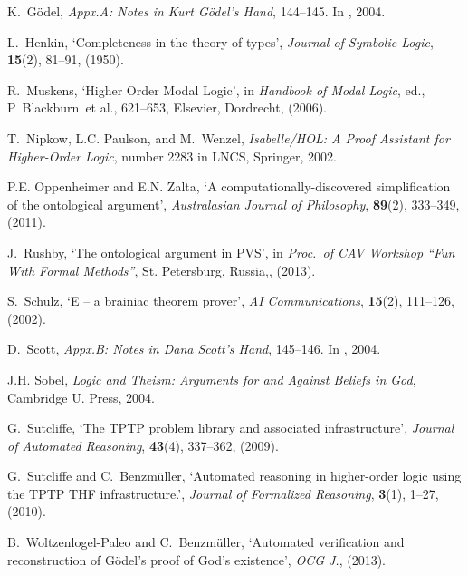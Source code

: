 \documentclass{birkjour}
\theoremstyle{definition}
\theoremstyle{remark}
\numberwithin{equation}{section}
\begin{document}
\begin{thebibliography}{1}
K.~G\"odel, {\em Appx.A: Notes in Kurt G\"odel's Hand},  144--145.
\newblock In  \cite{sobel2004logic}, 2004.

L.~Henkin, `Completeness in the theory of types', {\em Journal of Symbolic
  Logic}, {\bf 15}(2),  81--91, (1950).

R.~Muskens, `{Higher Order Modal Logic}', in {\em Handbook of Modal Logic},
  ed., P~Blackburn~et al.,  621--653, Elsevier, Dordrecht, (2006).

T.~Nipkow, L.C. Paulson, and M.~Wenzel, {\em {Isabelle/HOL: A Proof Assistant
  for Higher-Order Logic}}, number 2283 in LNCS, Springer, 2002.

P.E. Oppenheimer and E.N. Zalta, `A computationally-discovered simplification
  of the ontological argument', {\em Australasian Journal of Philosophy}, {\bf
  89}(2),  333--349, (2011).

J.~Rushby, `The ontological argument in {PVS}', in {\em Proc.~of CAV Workshop
  ``Fun With Formal Methods''}, St. Petersburg, Russia,, (2013).

S.~Schulz, `E -- a brainiac theorem prover', {\em {AI Communications}}, {\bf
  15}(2),  111--126, (2002).

D.~Scott, {\em Appx.B: Notes in Dana Scott's Hand},  145--146.
\newblock In  \cite{sobel2004logic}, 2004.

J.H. Sobel, {\em Logic and Theism: Arguments for and Against Beliefs in God},
  Cambridge U. Press, 2004.

G.~Sutcliffe, `The {TPTP} problem library and associated infrastructure', {\em
  Journal of Automated Reasoning}, {\bf 43}(4),  337--362, (2009).

G.~Sutcliffe and C.~Benzm{\"u}ller, `Automated reasoning in higher-order logic
  using the {TPTP THF} infrastructure.', {\em Journal of Formalized Reasoning},
  {\bf 3}(1),  1--27, (2010).

B.~Woltzenlogel-Paleo and C.~Benzm{\"u}ller, `Automated verification and
  reconstruction of {G\"odel's} proof of {God's} existence', {\em OCG J.},
  (2013).

\end{thebibliography}


\end{document}
